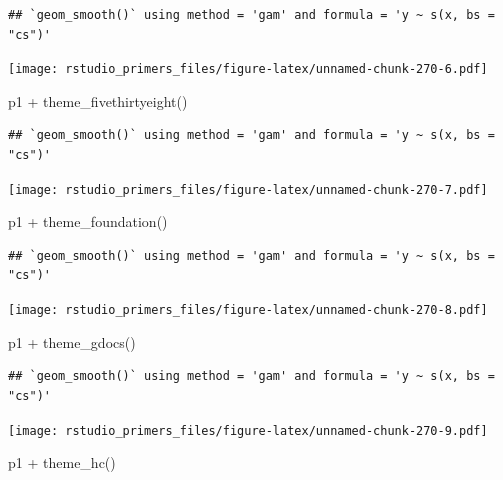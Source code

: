 \documentclass[
]{article}
\newenvironment{Shaded}{\begin{snugshade}}{\end{snugshade}}
\newcommand{\FunctionTok}[1]{\textcolor[rgb]{0.00,0.00,0.00}{#1}}
\newcommand{\NormalTok}[1]{#1}
\newcommand{\SpecialCharTok}[1]{\textcolor[rgb]{0.00,0.00,0.00}{#1}}
\begin{document}
\begin{verbatim}
## `geom_smooth()` using method = 'gam' and formula = 'y ~ s(x, bs = "cs")'
\end{verbatim}

\texttt{[image: rstudio\_primers\_files/figure-latex/unnamed-chunk-270-6.pdf]}

\begin{Shaded}
\begin{Highlighting}[]
\NormalTok{p1 }\SpecialCharTok{+} \FunctionTok{theme\_fivethirtyeight}\NormalTok{()}
\end{Highlighting}
\end{Shaded}

\begin{verbatim}
## `geom_smooth()` using method = 'gam' and formula = 'y ~ s(x, bs = "cs")'
\end{verbatim}

\texttt{[image: rstudio\_primers\_files/figure-latex/unnamed-chunk-270-7.pdf]}

\begin{Shaded}
\begin{Highlighting}[]
\NormalTok{p1 }\SpecialCharTok{+} \FunctionTok{theme\_foundation}\NormalTok{()}
\end{Highlighting}
\end{Shaded}

\begin{verbatim}
## `geom_smooth()` using method = 'gam' and formula = 'y ~ s(x, bs = "cs")'
\end{verbatim}

\texttt{[image: rstudio\_primers\_files/figure-latex/unnamed-chunk-270-8.pdf]}

\begin{Shaded}
\begin{Highlighting}[]
\NormalTok{p1 }\SpecialCharTok{+} \FunctionTok{theme\_gdocs}\NormalTok{()}
\end{Highlighting}
\end{Shaded}

\begin{verbatim}
## `geom_smooth()` using method = 'gam' and formula = 'y ~ s(x, bs = "cs")'
\end{verbatim}

\texttt{[image: rstudio\_primers\_files/figure-latex/unnamed-chunk-270-9.pdf]}

\begin{Shaded}
\begin{Highlighting}[]
\NormalTok{p1 }\SpecialCharTok{+} \FunctionTok{theme\_hc}\NormalTok{()}
\end{Highlighting}
\end{Shaded}
\end{document}
